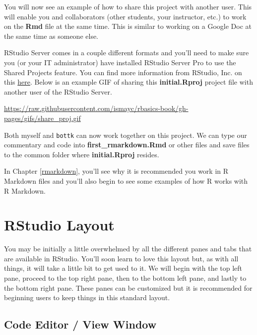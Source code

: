 \documentclass[]{tufte-book}
\begin{document}
You will now see an example of how to share this project with another
user. This will enable you and collaborators (other students, your
instructor, etc.) to work on the \textbf{Rmd} file at the same time.
This is similar to working on a Google Doc at the same time as someone
else.

RStudio Server comes in a couple different formats and you'll need to
make sure you (or your IT administrator) have installed RStudio Server
Pro to use the Shared Projects feature. You can find more information
from RStudio, Inc. on this
\href{https://support.rstudio.com/hc/en-us/articles/211659737-Sharing-Projects-in-RStudio-Server-Pro}{here}.
Below is an example GIF of sharing this \textbf{initial.Rproj} project
file with another user of the RStudio Server.

\vspace{0.1in}

\begin{center}\footnotesize{\url{https://raw.githubusercontent.com/ismayc/rbasics-book/gh-pages/gifs/share_proj.gif}}\end{center}

\vspace{0.1in}

Both myself and \texttt{bottk} can now work together on this project. We
can type our commentary and code into \textbf{first\_rmarkdown.Rmd} or
other files and save files to the common folder where
\textbf{initial.Rproj} resides.

In Chapter \ref{rmarkdown}, you'll see why it is recommended you work in
R Markdown files and you'll also begin to see some examples of how R
works with R Markdown.

\section{RStudio Layout}\label{rstudio-layout}

You may be initially a little overwhelmed by all the different panes and
tabs that are available in RStudio. You'll soon learn to love this
layout but, as with all things, it will take a little bit to get used to
it. We will begin with the top left pane, proceed to the top right pane,
then to the bottom left pane, and lastly to the bottom right pane. These
panes can be customized but it is recommended for beginning users to
keep things in this standard layout.

\subsection{Code Editor / View Window}\label{code-editor-view-window}
\end{document}
